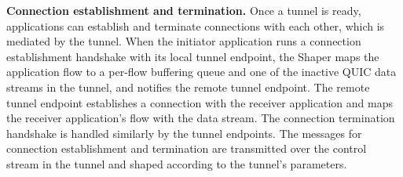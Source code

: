\textbf{Connection establishment and termination.}
Once a tunnel is ready, applications can establish and terminate connections
with each other, which is mediated by the tunnel.
When the initiator application runs a connection establishment handshake with
its local tunnel endpoint, the Shaper maps the application flow to
a per-flow buffering queue and one of the inactive QUIC data streams in the
tunnel, and notifies the remote tunnel endpoint.
The remote tunnel endpoint establishes a connection with the receiver
application and maps the receiver application's flow with the data stream.
The connection termination handshake is handled similarly by the tunnel
endpoints. The messages for connection establishment and termination are
transmitted over the control stream in the tunnel and shaped according to the
tunnel's parameters.


